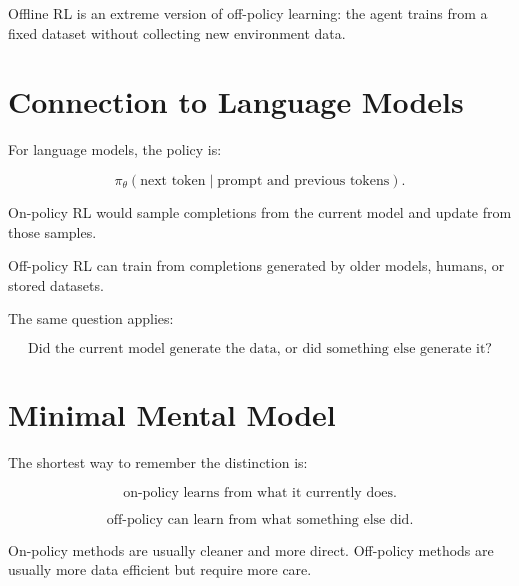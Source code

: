 \documentclass[11pt]{article}
\begin{document}
Offline RL is an extreme version of off-policy learning:
the agent trains from a fixed dataset without collecting new environment data.

\section{Connection to Language Models}

For language models, the policy is:

\[
\pi_\theta(\text{next token} \mid \text{prompt and previous tokens}).
\]

On-policy RL would sample completions from the current model and update from those samples.

Off-policy RL can train from completions generated by older models, humans, or stored datasets.

The same question applies:

\[
\boxed{
\text{Did the current model generate the data, or did something else generate it?}
}
\]

\section{Minimal Mental Model}

The shortest way to remember the distinction is:

\[
\boxed{
\text{on-policy learns from what it currently does.}
}
\]

\[
\boxed{
\text{off-policy can learn from what something else did.}
}
\]

On-policy methods are usually cleaner and more direct.
Off-policy methods are usually more data efficient but require more care.
\end{document}
